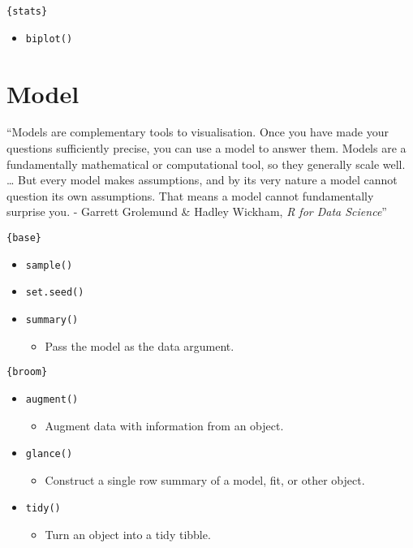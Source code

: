 \documentclass[
]{book}
\providecommand{\tightlist}{%
  \setlength{\itemsep}{0pt}\setlength{\parskip}{0pt}}
\begin{document}
\texttt{\{stats\}}

\begin{itemize}
\tightlist
\item
  \texttt{biplot()}
\end{itemize}

\hypertarget{model}{%
\chapter{Model}\label{model}}

``Models are complementary tools to visualisation. Once you have made your questions sufficiently precise, you can use a model to answer them. Models are a fundamentally mathematical or computational tool, so they generally scale well. \ldots{} But every model makes assumptions, and by its very nature a model cannot question its own assumptions. That means a model cannot fundamentally surprise you.
- Garrett Grolemund \& Hadley Wickham, \emph{R for Data Science}''

\texttt{\{base\}}

\begin{itemize}
\tightlist
\item
  \texttt{sample()}
\item
  \texttt{set.seed()}
\item
  \texttt{summary()}

  \begin{itemize}
  \tightlist
  \item
    Pass the model as the data argument.
  \end{itemize}
\end{itemize}

\texttt{\{broom\}}

\begin{itemize}
\tightlist
\item
  \texttt{augment()}

  \begin{itemize}
  \tightlist
  \item
    Augment data with information from an object.
  \end{itemize}
\item
  \texttt{glance()}

  \begin{itemize}
  \tightlist
  \item
    Construct a single row summary of a model, fit, or other object.
  \end{itemize}
\item
  \texttt{tidy()}

  \begin{itemize}
  \tightlist
  \item
    Turn an object into a tidy tibble.
  \end{itemize}
\end{itemize}
\end{document}

